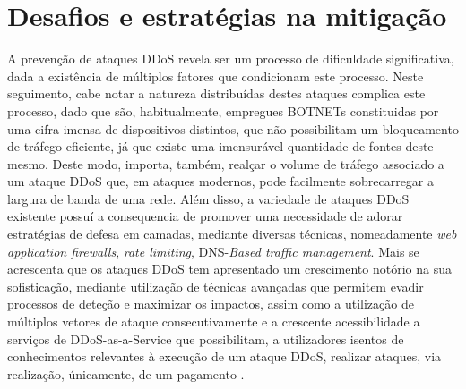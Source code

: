\section{Desafios e estratégias na mitigação}
A prevenção de ataques DDoS revela ser um processo de dificuldade significativa, dada a existência de múltiplos fatores que condicionam este processo. Neste seguimento, cabe notar a natureza distribuídas destes ataques complica este processo, dado que são, habitualmente, empregues BOTNETs constituidas por uma cifra imensa de dispositivos distintos, que não possibilitam um bloqueamento de tráfego eficiente, já que existe uma imensurável quantidade de fontes deste mesmo. Deste modo, importa, também, realçar o volume de tráfego associado a um ataque DDoS que, em ataques modernos, pode facilmente sobrecarregar a largura de banda de uma rede. Além disso, a variedade de ataques DDoS existente possuí a consequencia de promover uma necessidade de adorar estratégias de defesa em camadas, mediante diversas técnicas, nomeadamente \textit{web application firewalls}, \textit{rate limiting}, DNS-\textit{Based traffic management}. Mais se acrescenta que os ataques DDoS tem apresentado um crescimento notório na sua sofisticação, mediante utilização de técnicas avançadas que permitem evadir processos de deteção e maximizar os impactos, assim como a utilização de múltiplos vetores de ataque consecutivamente e a crescente acessibilidade a serviços de DDoS-as-a-Service que possibilitam, a utilizadores isentos de conhecimentos relevantes à execução de um ataque DDoS, realizar ataques, via realização, únicamente, de um pagamento \cite{perimeter81_ddos_motivations,radware_ddos_prevention,redhelix_rise_ddos_attacks}.

